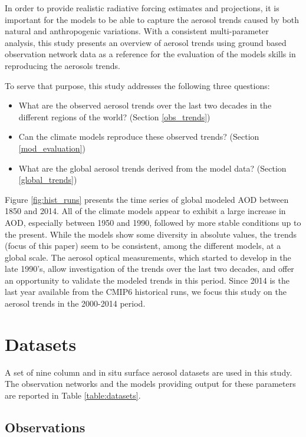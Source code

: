 \documentclass[acp, manuscript]{copernicus}
\begin{document}
In order to provide realistic radiative forcing estimates and projections, it is important for the models to be able to capture the aerosol trends caused by both natural and anthropogenic variations. With a consistent multi-parameter analysis, this study presents an overview of aerosol trends using ground based observation network data as a reference for the evaluation of the models skills in reproducing the aerosols trends.

To serve that purpose, this study addresses the following three questions:
\begin{itemize}
    \item What are the observed aerosol trends over the last two decades in the different regions of the world? (Section \ref{obs_trends})
    \item Can the climate models reproduce these observed trends? (Section \ref{mod_evaluation})
    \item What are the global aerosol trends derived from the model data? (Section \ref{global_trends})
\end{itemize}

Figure \ref{fig:hist_runs} presents the time series of global modeled AOD between 1850 and 2014. All of the climate models appear to exhibit a large increase in AOD, especially between 1950 and 1990, followed by more stable conditions up to the present. While the models show some diversity in absolute values, the trends (focus of this paper) seem to be consistent, among the different models, at a global scale. The aerosol optical measurements, which started to develop in the late 1990's, allow investigation of the trends over the last two decades, and offer an opportunity to validate the modeled trends in this period. Since 2014 is the last year available from the CMIP6 historical runs, we focus this study on the aerosol trends in the 2000-2014 period.


\section{Datasets}
A set of nine column and in situ surface aerosol datasets are used in this study. The observation networks and the models providing output for these parameters are reported in Table \ref{table:datasets}.


\subsection{Observations}
\end{document}
